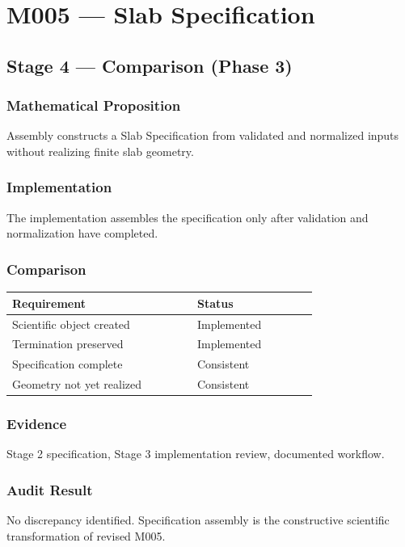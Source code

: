\chapter{M005 --- Slab Specification}

\section{Stage 4 --- Comparison (Phase 3)}

\subsection{Mathematical Proposition}

Assembly constructs a Slab Specification from validated and normalized
inputs without realizing finite slab geometry.

\subsection{Implementation}

The implementation assembles the specification only after validation and
normalization have completed.

\subsection{Comparison}

\begin{center}
\begin{tabular}{|p{0.46\linewidth}|p{0.30\linewidth}|}
\hline
Requirement & Status\\
\hline
Scientific object created & Implemented\\
Termination preserved & Implemented\\
Specification complete & Consistent\\
Geometry not yet realized & Consistent\\
\hline
\end{tabular}
\end{center}

\subsection{Evidence}

Stage 2 specification, Stage 3 implementation review, documented
workflow.

\subsection{Audit Result}

No discrepancy identified. Specification assembly is the constructive
scientific transformation of revised M005.
